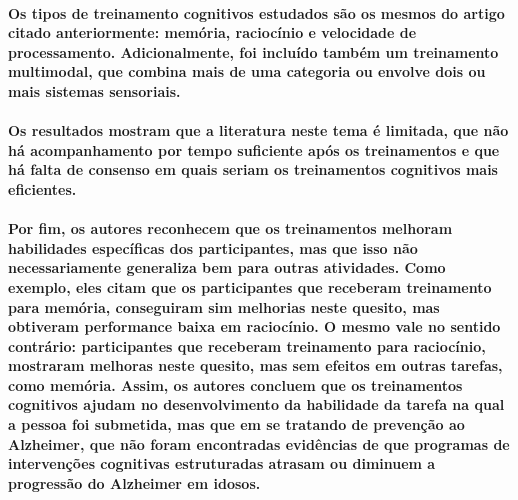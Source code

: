 \documentclass[a4paper]{article}    %
\begin{document}
\paragraph{Os tipos de treinamento cognitivos estudados são os mesmos do artigo citado anteriormente: memória, raciocínio e velocidade de processamento. Adicionalmente, foi incluído também um treinamento multimodal, que combina mais de uma categoria ou envolve dois ou mais sistemas sensoriais.}

\paragraph{Os resultados mostram que a literatura neste tema é limitada, que não há acompanhamento por tempo suficiente após os treinamentos e que há falta de consenso em quais seriam os treinamentos cognitivos mais eficientes.}

\paragraph{Por fim, os autores reconhecem que os treinamentos melhoram habilidades específicas dos participantes, mas que isso não necessariamente generaliza bem para outras atividades. Como exemplo, eles citam que os participantes que receberam treinamento para memória, conseguiram sim melhorias neste quesito, mas obtiveram performance baixa em raciocínio. O mesmo vale no sentido contrário: participantes que receberam treinamento para raciocínio, mostraram melhoras neste quesito, mas sem efeitos em outras tarefas, como memória. Assim, os autores concluem que os treinamentos cognitivos ajudam no desenvolvimento da habilidade da tarefa na qual a pessoa foi submetida, mas que em se tratando de prevenção ao Alzheimer, que não foram encontradas evidências de que programas de intervenções cognitivas estruturadas atrasam ou diminuem a progressão do Alzheimer em idosos.}

\end{document}
